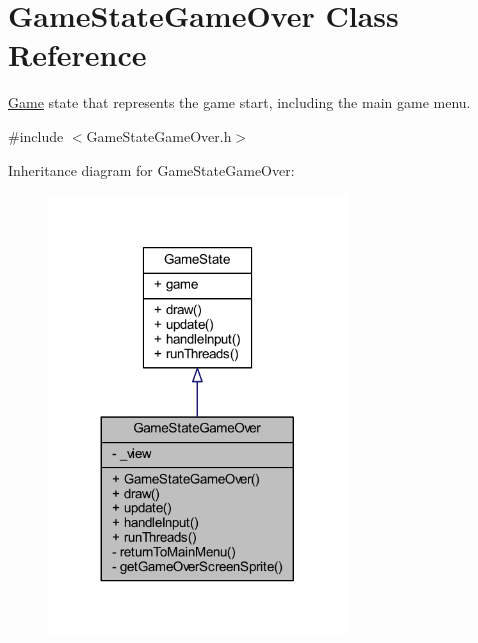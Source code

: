 \hypertarget{class_game_state_game_over}{\section{Game\+State\+Game\+Over Class Reference}
\label{class_game_state_game_over}
}


\hyperlink{class_game}{Game} state that represents the game start, including the main game menu.  




{\ttfamily \#include $<$Game\+State\+Game\+Over.\+h$>$}



Inheritance diagram for Game\+State\+Game\+Over\+:
\nopagebreak
\begin{figure}[H]
\begin{center}
\leavevmode
\includegraphics[width=224pt]{class_game_state_game_over__inherit__graph}
\end{center}
\end{figure}


